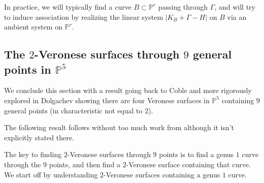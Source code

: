 \documentclass[reqno, 11pt]{amsart}
\theoremstyle{definition}
\theoremstyle{remark}
\numberwithin{equation}{section}
\numberwithin{thm}{section}
\numberwithin{prop}{section}
\numberwithin{lem}{section}
\numberwithin{cor}{section}
\numberwithin{conj}{section}
\numberwithin{defn}{section}
\theoremstyle{plain}
\theoremstyle{definition}
\newcommand\bp{{\mathbb P}}
\begin{document}
In practice, we will typically find a curve $B \subset \bp^{r}$ passing through $\Gamma$, and will try to induce association by realizing the linear system $|K_{B} + \Gamma - H|$ on $B$ via an ambient system on $\bp^{r}$.


\subsection{The $2$-Veronese surfaces through $9$ general points in $\bp^{5}$}
\label{ssec:2-veronese-interpolation}
We conclude this section with a result going back to Coble \cite[Theorem 19]{coble:associated-sets-of-points} and more rigorously explored in Dolgachev \cite[Theorems 5.2 and 5.6]{dolgachev:on-certain-families-of-elliptic-curves-in-projective-space} showing there are four Veronese surfaces in $\bp^{5}$ containing $9$ general points (in characteristic not equal to $2$). 

The following result follows without too much work from \cite{dolgachev:on-certain-families-of-elliptic-curves-in-projective-space} although it isn't explicitly stated there. 

The key to finding $2$-Veronese surfaces through $9$ points is to find a genus $1$ curve through the $9$ points,
and then find a $2$-Veronese surface containing that curve. We start off by understanding $2$-Veronese
surfaces containing a genus $1$ curve.
\end{document}
